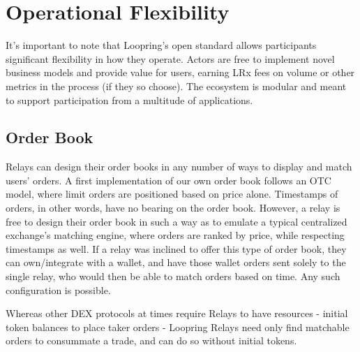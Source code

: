 \documentclass[UTF8,nofonts]{article}
\makeatletter
\newenvironment{figurehere}
 {\def\@captype{figure}}
 {}
\makeatother
\begin{document}
\begin{multicols}{2}
\begin{enumerate}
\end{enumerate}





%
%
%

\section{Operational Flexibility\label{sec:business_model}}
It's important to note that Loopring's open standard allows participants significant flexibility in how they operate. Actors are free to implement novel business models and provide value for users, earning LRx fees on volume or other metrics in the process (if they so choose). The ecosystem is modular and meant to support participation from a multitude of applications.


\subsection{Order Book\label{sec:order_book}}
Relays can design their order books in any number of ways to display and match users' orders. A first implementation of our own order book follows an OTC model, where limit orders are positioned based on price alone. Timestamps of orders, in other words, have no bearing on the order book. However, a relay is free to design their order book in such a way as to emulate a typical centralized exchange's matching engine, where orders are ranked by price, while respecting timestamps as well. If a relay was inclined to offer this type of order book, they can own/integrate with a wallet, and have those wallet orders sent solely to the single relay, who would then be able to match orders based on time. Any such configuration is possible.


Whereas other DEX protocols at times require Relays to have resources - initial token balances to place taker orders - Loopring Relays need only find matchable orders to consummate a trade, and can do so without initial tokens.


\end{multicols}
\end{document}
